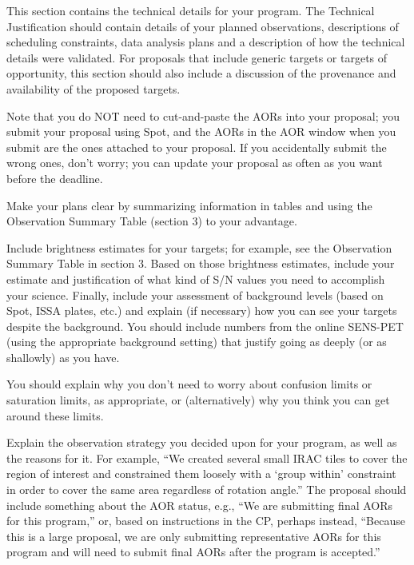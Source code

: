\documentclass[letterpaper,12pt]{article}
\begin{document}
This section contains the technical details for your program. 
The Technical Justification should contain details of your planned observations, 
descriptions of scheduling constraints, data analysis plans and a 
description of how the technical details were validated. For proposals that 
include generic targets or targets of opportunity, this section should also 
include a discussion of the provenance and availability of the 
proposed targets.\newline

Note that you do NOT need to cut-and-paste the AORs into your
proposal; you submit your proposal using Spot, and the AORs in
the AOR window when you submit are the ones attached to your
proposal.  If you accidentally submit the wrong ones, don't worry;
you can update your proposal as often as you want before
the deadline.\newline

Make your plans clear by summarizing information in tables
and using the Observation Summary Table (section 3) to your advantage.\newline

Include brightness estimates 
for your targets; for example, see the Observation Summary Table
in section 3.  Based on those brightness estimates, include
your estimate and justification of what kind of S/N values you
need to accomplish your science.  Finally, include your
assessment of background levels (based on Spot, ISSA plates,
etc.) and explain (if necessary) how you can see your targets
despite the background. You should include numbers from the 
online SENS-PET (using the appropriate background setting) 
that justify going as deeply (or as shallowly) as you have.\newline

You should explain why you don't need to worry
about confusion limits or saturation limits, as appropriate, or
(alternatively) why you think you can get around these limits.\newline

Explain the observation strategy you decided upon for your
program, as well as the reasons for it.  For example, ``We
created several small IRAC tiles to cover the region of
interest and constrained them loosely with a `group within'
constraint in order to cover the same area regardless of
rotation angle.''  The proposal should include something about
the AOR status, e.g., ``We are submitting final AORs for this
program,''  or, based on instructions in the CP, perhaps
instead, ``Because this is a large proposal, we are only
submitting representative AORs for this program and will need to
submit final AORs after the program is accepted.'' \newline
\end{document}
